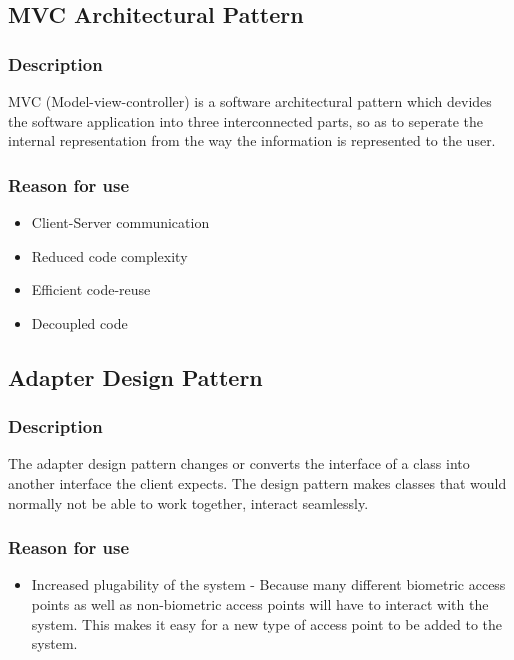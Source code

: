 \subsection{MVC Architectural Pattern}
	\subsubsection{Description}
	MVC (Model-view-controller) is a software architectural pattern which devides the software application into three interconnected parts, so as to seperate the internal representation from the way the information is represented to the user.
	\subsubsection{Reason for use}
	\begin{itemize}
		\item{Client-Server communication}
		\item{Reduced code complexity}
		\item{Efficient code-reuse}
		\item{Decoupled code}
	\end{itemize}
	
\subsection{Adapter Design Pattern}
	\subsubsection{Description}
	The adapter design pattern changes or converts the interface of a class into another interface the client expects. The design pattern makes classes that would normally not be able to work together, interact seamlessly.
	
	\subsubsection{Reason for use}
	\begin{itemize}
		\item{Increased plugability of the system} - Because many different biometric access points as well as non-biometric access points will have to interact with the system. This makes it easy for a new type of access point to be added to the system.
	\end{itemize}